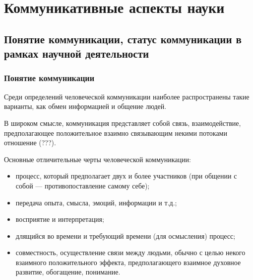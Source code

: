 \section{Коммуникативные аспекты науки} 

\subsection{Понятие коммуникации, статус коммуникации в рамках научной деятельности}

\subsubsection{Понятие коммуникации}




Среди определений человеческой коммуникации наиболее
распространены такие варианты, как обмен информацией и общение людей. 

В широком смысле, коммуникация представляет собой связь, взаимодействие,
предполагающее положительное взаимно связывающим некими потоками отношение (???).

Основные отличительные черты человеческой коммуникации:
\begin{itemize}
    \item процесс, который предполагает двух и более участников (при общении с собой --- противопоставление самому себе);
    \item передача опыта, смысла, эмоций, информации и т.д.;
    \item восприятие и интерпретация;
    \item длящийся во времени и требующий времени (для осмысления) процесс;
    \item совместность, осуществление связи между
    людьми, обычно с целью некого взаимного положительного эффекта, предполагающего
    взаимное духовное развитие, обогащение, понимание.
\end{itemize}

